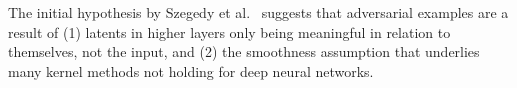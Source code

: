 \documentclass[a4paper, oneside]{discothesis}
\begin{document}
The initial hypothesis by Szegedy et al.\ \cite{szegedy2013intriguing} suggests that adversarial examples are a result of (1) latents in higher layers only being meaningful in relation to themselves, not the input, and (2) the smoothness assumption that underlies many kernel methods not holding for deep neural networks.


	













\end{document}
